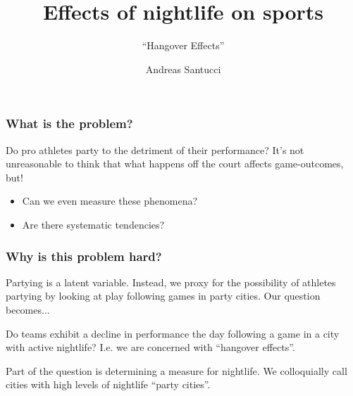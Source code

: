 \documentclass{beamer}
\author{Andreas Santucci} \institute{Stanford Teaching Fellow \\ Computational Math, Data Science} \title{Effects of nightlife on sports} \subtitle{``Hangover Effects''} %
\begin{document}
  \begin{frame} \maketitle \end{frame}

\begin{frame}   \frametitle{What is the problem?}
  \begin{block}{Do pro athletes party to the detriment of their performance?}     It's not unreasonable to think that what happens off the court affects game-outcomes, but!
    \begin{itemize}       
      \item Can we even measure these phenomena?
      \item Are there systematic tendencies?
    \end{itemize}       \end{block}
\end{frame}


\begin{frame}   
  \frametitle{Why is this problem hard?}
  \begin{block}{Partying is a latent variable.}
    Instead, we proxy for the possibility of athletes partying by looking at 
    play following games in party cities. Our question becomes...
  \end{block}
  \vspace{12pt}\begin{block}{Do teams exhibit a decline in performance the day following a game in a city with active nightlife?}     I.e. we are concerned with ``hangover effects''.
  \end{block}
  \vspace{12pt}\begin{block}{Part of the question is determining a measure for nightlife. }
    We colloquially call cities with high levels of nightlife ``party cities''.   \end{block}
\end{frame}

\end{document}
